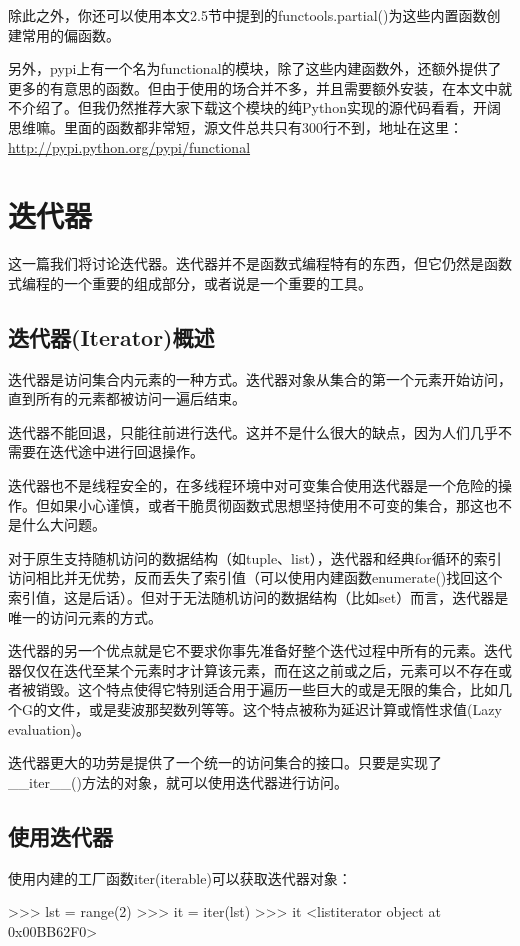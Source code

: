 \documentclass[12pt,a4paper]{report}
\begin{document}
除此之外，你还可以使用本文2.5节中提到的functools.partial()为这些内置函数创建常用的偏函数。

另外，pypi上有一个名为functional的模块，除了这些内建函数外，还额外提供了更多的有意思的函数。但由于使用的场合并不多，并且需要额外安装，在本文中就不介绍了。但我仍然推荐大家下载这个模块的纯Python实现的源代码看看，开阔思维嘛。里面的函数都非常短，源文件总共只有300行不到，地址在这里：\url{http://pypi.python.org/pypi/functional}

\chapter{迭代器}
这一篇我们将讨论迭代器。迭代器并不是函数式编程特有的东西，但它仍然是函数式编程的一个重要的组成部分，或者说是一个重要的工具。

\section{迭代器(Iterator)概述}
迭代器是访问集合内元素的一种方式。迭代器对象从集合的第一个元素开始访问，直到所有的元素都被访问一遍后结束。

迭代器不能回退，只能往前进行迭代。这并不是什么很大的缺点，因为人们几乎不需要在迭代途中进行回退操作。

迭代器也不是线程安全的，在多线程环境中对可变集合使用迭代器是一个危险的操作。但如果小心谨慎，或者干脆贯彻函数式思想坚持使用不可变的集合，那这也不是什么大问题。

对于原生支持随机访问的数据结构（如tuple、list），迭代器和经典for循环的索引访问相比并无优势，反而丢失了索引值（可以使用内建函数enumerate()找回这个索引值，这是后话）。但对于无法随机访问的数据结构（比如set）而言，迭代器是唯一的访问元素的方式。

迭代器的另一个优点就是它不要求你事先准备好整个迭代过程中所有的元素。迭代器仅仅在迭代至某个元素时才计算该元素，而在这之前或之后，元素可以不存在或者被销毁。这个特点使得它特别适合用于遍历一些巨大的或是无限的集合，比如几个G的文件，或是斐波那契数列等等。这个特点被称为延迟计算或惰性求值(Lazy evaluation)。

迭代器更大的功劳是提供了一个统一的访问集合的接口。只要是实现了\_\_iter\_\_()方法的对象，就可以使用迭代器进行访问。 

\section{使用迭代器} 
使用内建的工厂函数iter(iterable)可以获取迭代器对象： 
\begin{python}[moreemph={[4]42},caption={},label=ex1]
>>> lst = range(2)
>>> it = iter(lst)
>>> it
<listiterator object at 0x00BB62F0>
\end{python}
\end{document}
